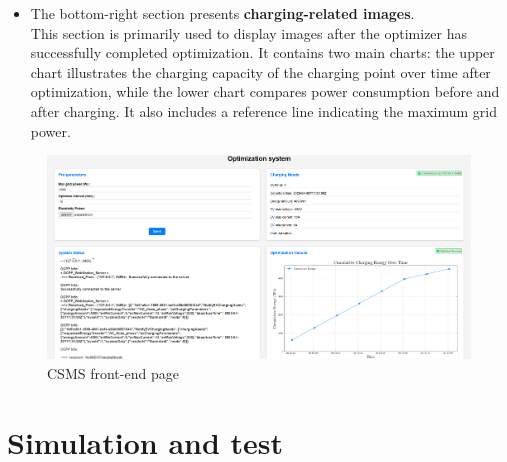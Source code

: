 \documentclass[
	english,
	ruledheaders=section,%
	class=report,%
	thesis={type=Report},%
	accentcolor=9c,%
	custommargins=true,%
	marginpar=false,%
	parskip=half-,%
	fontsize=11pt,%
	logofile={img/tuda_logo.pdf}, %
]{tudapub}
\begin{document}
\begin{itemize}
    \item The bottom-right section presents \textbf{charging-related images}. \\
    This section is primarily used to display images after the optimizer has successfully completed optimization. It contains two main charts: the upper chart illustrates the charging capacity of the charging point over time after optimization, while the lower chart compares power consumption before and after charging. It also includes a reference line indicating the maximum grid power.
    
\end{itemize}

\begin{figure}[H]
    \centering
    \includegraphics[width=1\linewidth]{img/web_opt.png}
    \caption{CSMS front-end page}
    \label{fig: web opt}
\end{figure}


\chapter{Simulation and test}
\label{SimulationAndTest}
\end{document}
